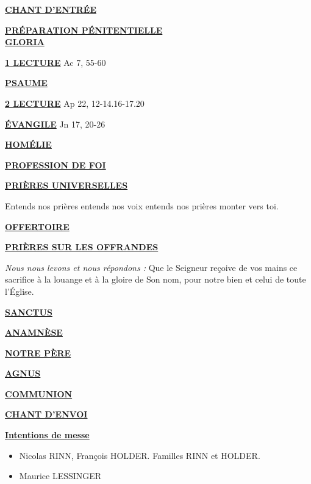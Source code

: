 \documentclass[11pt,a4paper]{article}
\newcommand*{\chants}{../chants}
\newcommand*{\messe}{../messe_bienveillance}
\newcommand*{\psaumes}{../psaumes}
\newcommand{\NewsItem}[1]{%
\vspace{3pt}
\underline{\textbf{#1}}
		  }
\begin{document}
\NewsItem{CHANT D'ENTRÉE}
	
\NewsItem{PRÉPARATION PÉNITENTIELLE}\\
	

\NewsItem{GLORIA}
	


\NewsItem{1\iere{} LECTURE} Ac 7, 55-60

\NewsItem{PSAUME}


\NewsItem{2\ieme{} LECTURE} Ap 22, 12-14.16-17.20

\NewsItem{ÉVANGILE} Jn 17, 20-26

\NewsItem{HOMÉLIE}

\NewsItem{PROFESSION DE FOI} 


\NewsItem{PRIÈRES UNIVERSELLES} 
Entends nos prières entends nos voix entends nos prières monter vers toi.

\NewsItem{OFFERTOIRE} 

\NewsItem{PRIÈRES SUR LES OFFRANDES}
\textit{Nous nous levons et nous répondons : }
Que le Seigneur reçoive de vos mains ce sacrifice à la louange et à la gloire 
de Son nom, pour notre bien et celui de toute l’Église.

\NewsItem{SANCTUS}



\NewsItem{ANAMNÈSE}


\NewsItem{NOTRE PÈRE}

\NewsItem{AGNUS}



\NewsItem{COMMUNION}


\NewsItem{CHANT D'ENVOI}

%

\newpage


\NewsItem{Intentions de messe}
\begin{itemize}
\item[\Cross]
Nicolas RINN, François HOLDER. Familles RINN et HOLDER.
\item[\Cross]
Maurice LESSINGER
\end{itemize}
\end{document}
